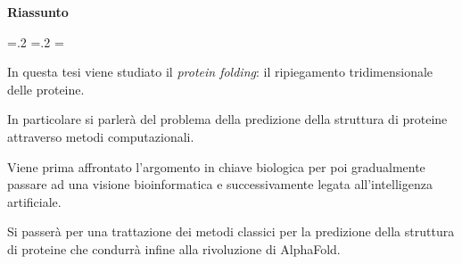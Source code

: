 	
	\vspace*{\fill}
	\begin{center}
		\textbf{\LARGE Riassunto}\newline\newline
	\end{center}
	\begin{list}{}{
			\leftmargin=.2\textwidth
			\rightmargin=.2\textwidth
			\listparindent=\parindent
			\itemsep=0pt
			\parsep=0pt}
		\item\relax
			In questa tesi viene studiato il \textit{protein folding}: il ripiegamento tridimensionale delle proteine. 
			\par In particolare si parlerà del problema della predizione della struttura di proteine attraverso metodi computazionali. 
			\par Viene prima affrontato l'argomento in chiave biologica per poi gradualmente passare ad una visione bioinformatica e successivamente legata all'intelligenza artificiale. 
			\par Si passerà per una trattazione dei metodi classici per la predizione della struttura di proteine che condurrà infine alla rivoluzione di AlphaFold.
		
	\end{list}
	\vfill %
	\clearpage



\clearpage
